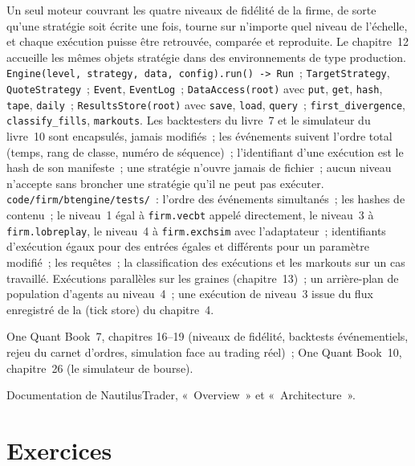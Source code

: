 \begin{build}
 Un seul moteur couvrant les quatre niveaux de fidélité de la firme, de sorte qu'une stratégie soit écrite une fois, tourne sur n'importe quel niveau de l'échelle, et
chaque exécution puisse être retrouvée, comparée et reproduite. Le chapitre~12 accueille les mêmes objets stratégie dans des environnements de type production.
 \texttt{Engine(level, strategy, data, config).run() -> Run}~; \texttt{TargetStrategy}, \texttt{QuoteStrategy}~;
\texttt{Event}, \texttt{EventLog}~; \texttt{DataAccess(root)} avec \texttt{put}, \texttt{get}, \texttt{hash}, \texttt{tape},
\texttt{daily}~; \texttt{ResultsStore(root)} avec \texttt{save}, \texttt{load}, \texttt{query}~; \texttt{first\_divergence},
\texttt{classify\_fills}, \texttt{markouts}.
 Les backtesters du livre~7 et le simulateur du livre~10 sont encapsulés, jamais modifiés~; les événements suivent l'ordre total (temps, rang de classe,
numéro de séquence)~; l'identifiant d'une exécution est le hash de son manifeste~; une stratégie n'ouvre jamais de fichier~; aucun niveau n'accepte sans broncher une stratégie qu'il ne peut pas exécuter.
 \texttt{code/firm/btengine/tests/}~: l'ordre des événements simultanés~; les hashes de contenu~; le niveau~1 égal à
\texttt{firm.vecbt} appelé directement, le niveau~3 à \texttt{firm.lobreplay}, le niveau~4 à \texttt{firm.exchsim} avec l'adaptateur~; identifiants d'exécution égaux
pour des entrées égales et différents pour un paramètre modifié~; les requêtes~; la classification des exécutions et les markouts sur un cas travaillé.
 Exécutions parallèles sur les graines (chapitre~13)~; un arrière-plan de population d'agents au niveau~4~; une exécution de niveau~3 issue du
flux enregistré de la  (tick store) du chapitre~4.
\end{build}

\begin{omsources}
\item One Quant Book~7, chapitres 16--19 (niveaux de fidélité, backtests événementiels, rejeu du carnet d'ordres, simulation face au trading réel)~; One Quant
Book~10, chapitre~26 (le simulateur de bourse).
\item Documentation de NautilusTrader, «~Overview~» et «~Architecture~».
\end{omsources}

\section{Exercices}

